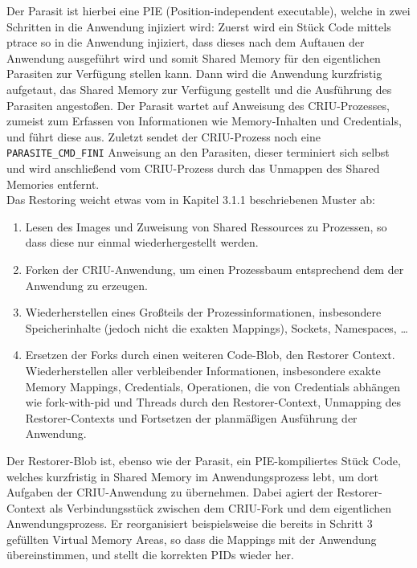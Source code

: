 \documentclass[a4paper]{article}
\begin{document}
Der Parasit ist hierbei eine PIE (Position-independent executable), welche in zwei Schritten in die Anwendung injiziert wird: Zuerst wird ein Stück Code mittels ptrace so in die Anwendung injiziert, dass dieses nach dem Auftauen der Anwendung ausgeführt wird und somit Shared Memory für den eigentlichen Parasiten zur Verfügung stellen kann. Dann wird die Anwendung kurzfristig aufgetaut, das Shared Memory zur Verfügung gestellt und die Ausführung des Parasiten angestoßen. Der Parasit wartet auf Anweisung des CRIU-Prozesses, zumeist zum Erfassen von Informationen wie Memory-Inhalten und Credentials, und führt diese aus. Zuletzt sendet der CRIU-Prozess noch eine \texttt{PARASITE\_CMD\_FINI} Anweisung an den Parasiten, dieser terminiert sich selbst und wird anschließend vom CRIU-Prozess durch das Unmappen des Shared Memories entfernt.\\
Das Restoring weicht etwas vom in Kapitel 3.1.1 beschriebenen Muster ab:
\begin{enumerate}
    \item Lesen des Images und Zuweisung von Shared Ressources zu Prozessen, so dass diese nur einmal wiederhergestellt werden.
    \item Forken der CRIU-Anwendung, um einen Prozessbaum entsprechend dem der Anwendung zu erzeugen.
    \item Wiederherstellen eines Großteils der Prozessinformationen, insbesondere Speicherinhalte (jedoch nicht die exakten Mappings), Sockets, Namespaces, \dots
    \item Ersetzen der Forks durch einen weiteren Code-Blob, den Restorer Context. Wiederherstellen aller verbleibender Informationen, insbesondere exakte Memory Mappings, Credentials, Operationen, die von Credentials abhängen wie fork-with-pid und Threads durch den Restorer-Context, Unmapping des Restorer-Contexts und Fortsetzen der planmäßigen Ausführung der Anwendung.
\end{enumerate}
Der Restorer-Blob ist, ebenso wie der Parasit, ein PIE-kompiliertes Stück Code, welches kurzfristig in Shared Memory im Anwendungsprozess lebt, um dort Aufgaben der CRIU-Anwendung zu übernehmen. Dabei agiert der Restorer-Context als Verbindungsstück zwischen dem CRIU-Fork und dem eigentlichen Anwendungsprozess. Er reorganisiert beispielsweise die bereits in Schritt 3 gefüllten Virtual Memory Areas, so dass die Mappings mit der Anwendung übereinstimmen, und stellt die korrekten PIDs wieder her.\\ \\
\end{document}
